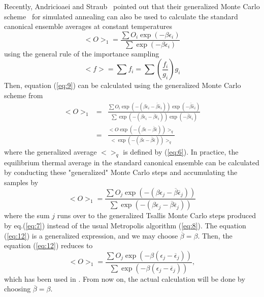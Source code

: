 Recently, Andricioaei and Straub~\cite{AS2,AS3} pointed out that their
generalized Monte Carlo scheme~\cite{AS1} for simulated annealing can
also be used to calculate the standard canonical ensemble averages at
constant temperatures
\begin{equation}
<O>_{1}=\frac{\sum O_{i}\exp(-\beta \epsilon_{i})}
{\sum \exp(-\beta \epsilon_{i})}
\label{eq:9}
\end{equation}
using the general rule of the importance sampling~\cite{VW}
\begin{equation}
<f>=\sum f_{i}=\sum \left(\frac{f_{i}}{g_{i}}\right)g_{i}
\label{eq:8b}
\end{equation}
Then, equation (\ref{eq:9}) can be calculated using the generalized
Monte Carlo scheme from
\begin{eqnarray}
<O>_{1}&=&\frac{ \sum O_{i}\exp\left(-\left(\beta\epsilon_{i}-\overline{\beta} \overline{\epsilon}_{i} \right)\right)\exp\left(-\overline{\beta} \overline{\epsilon}_{i}\right) }{\sum \exp\left(-\left(\beta\epsilon_{i}-\overline{\beta} \overline{\epsilon}_{i}\right)  \right)\exp(-\overline{\beta}\overline{\epsilon}_{i})}
\label{eq:10}\\
&=& \frac{< O \exp\left(-\left(\beta\epsilon- \overline{\beta}\overline{\epsilon}  \right)\right)>_{q}}{<\exp\left(-\left(\beta\epsilon- \overline{\beta}\overline{\epsilon}\right)\right)>_{q}}
\label{eq:11}
\end{eqnarray}
where the generalized average $<>_{q}$ is defined by (\ref{eq:6}).
In practice, the equilibrium thermal average in the standard
canonical ensemble can be calculated by conducting these
"generalized" Monte Carlo steps and accumulating the samples by
\begin{equation}
<O>_{1}=\frac{\sum O_{j} \exp\left(-\left(\beta\epsilon_{j}-  \overline{\beta}\overline{\epsilon}_{j}\right)\right)}
{\sum \exp\left(-\left(\beta\epsilon_{j}-
\overline{\beta}\overline{\epsilon}_{j}\right)\right)}
\label{eq:12}
\end{equation}
where the sum $j$ runs over to the generalized Tsallis Monte
Carlo steps produced by eq.(\ref{eq:7}) instead of the usual
Metropolis algorithm (\ref{eq:8}). The equation (\ref{eq:12})
is a generalized expression, and we may choose
$\overline{\beta}=\beta$. Then, the equation (\ref{eq:12})
reduces to
\begin{equation}
<O>_{1}=\frac{\sum O_{j} \exp\left(-\beta\left(\epsilon_{j}-  \overline{\epsilon}_{j}\right)\right)}
{\sum \exp\left(-\beta\left(\epsilon_{j}-
\overline{\epsilon}_{j}\right)\right)},
\label{eq:12x}
\end{equation}
which has been used in \cite{AS2,AS3}. From now on, the actual
calculation will be done by choosing $\overline{\beta}=\beta$.

